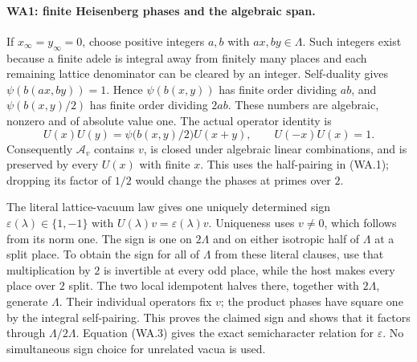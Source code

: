 \paragraph{WA1: finite Heisenberg phases and the algebraic span.}
If $x_\infty=y_\infty=0$, choose positive integers $a,b$ with
$ax,by\in\Lambda$.  Such integers exist because a finite adele is
integral away from finitely many places and each remaining lattice
denominator can be cleared by an integer.  Self-duality gives
$\psi(b(ax,by))=1$.  Hence $\psi(b(x,y))$ has finite order dividing
$ab$, and $\psi(b(x,y)/2)$ has finite order dividing $2ab$.
These numbers are algebraic, nonzero and of absolute value one.
The actual operator identity is
\[
 U(x)U(y)=\psi\bigl(b(x,y)/2\bigr)U(x+y),\qquad
 U(-x)U(x)=1.                                                 \tag{WA.3}
\]
Consequently $\mathcal A_v$ contains $v$, is closed under algebraic
linear combinations, and is preserved by every $U(x)$ with finite
$x$.  This uses the half-pairing in (WA.1); dropping its factor of
$1/2$ would change the phases at primes over $2$.

The literal lattice-vacuum law gives one uniquely determined sign
$\varepsilon(\lambda)\in\{1,-1\}$ with
$U(\lambda)v=\varepsilon(\lambda)v$.  Uniqueness uses $v\ne0$,
which follows from its norm one.  The sign is one on $2\Lambda$
and on either isotropic half of $\Lambda$ at a split place.
To obtain the sign for all of $\Lambda$ from these literal clauses,
use that multiplication by $2$ is invertible at every odd place,
while the host makes every place over $2$ split.  The two local
idempotent halves there, together with $2\Lambda$, generate
$\Lambda$.  Their individual operators fix $v$; the product
phases have square one by the integral self-pairing.  This proves
the claimed sign and shows that it factors through $\Lambda/2\Lambda$.
Equation (WA.3) gives the exact semicharacter relation for
$\varepsilon$.  No simultaneous sign choice for unrelated vacua
is used.

